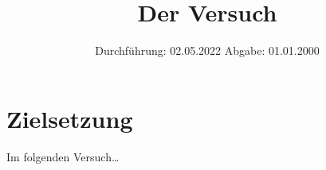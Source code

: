 

\subject{V123}
\title{Der Versuch}
\date{
    Durchführung: 02.05.2022
     \hspace{3em}
    Abgabe: 01.01.2000
}


\maketitle
\thispagestyle{empty}
\tableofcontents
\newpage

\section{Zielsetzung}

    Im folgenden Versuch…


\clearpage


\clearpage


\clearpage


\clearpage

\printbibliography


